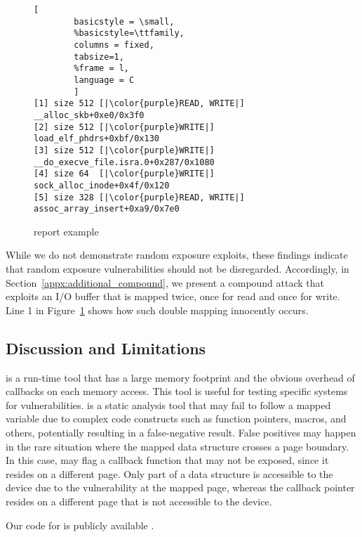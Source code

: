 %
\begin{figure}[t]
\begin{adjustbox}{width=0.9\linewidth}
        \begin{lstlisting}[
        basicstyle = \small,
        %basicstyle=\ttfamily,
        columns = fixed,
        tabsize=1,
        %frame = l,
        language = C
        ]
[1] size 512 [|\color{purple}READ, WRITE|] __alloc_skb+0xe0/0x3f0
[2] size 512 [|\color{purple}WRITE|] load_elf_phdrs+0xbf/0x130
[3] size 512 [|\color{purple}WRITE|] __do_execve_file.isra.0+0x287/0x1080
[4] size 64  [|\color{purple}WRITE|] sock_alloc_inode+0x4f/0x120
[5] size 328 [|\color{purple}READ, WRITE|] assoc_array_insert+0xa9/0x7e0
        \end{lstlisting}
\end{adjustbox}
        \caption{\dkasan report example}
        \label{fig:dkasan-report}
\end{figure}

While we do not demonstrate random exposure exploits, these findings indicate that random exposure vulnerabilities should not be disregarded. Accordingly, in Section~\ref{appx:additional_compound}, we present a compound attack that exploits an I/O buffer that is mapped twice, once for read and once for write. Line 1 in Figure~\ref{fig:dkasan-report}  shows how such double mapping innocently occurs.

\subsection{Discussion and Limitations}
\dkasan is a run-time tool that has a large memory footprint and the obvious overhead of callbacks on each memory access. This tool is useful for testing specific systems for vulnerabilities.
\tool is a static analysis tool that may fail to follow a mapped variable due to complex code constructs such as function pointers, macros, and others, potentially resulting in a false-negative result. False positives may happen in the rare situation 
where the mapped data structure crosses a  page boundary. In this case, \tool may flag a callback function that may not be exposed, since it resides on a different page. Only part of a data structure is accessible to the device due to the \subpage{} vulnerability at the mapped page, whereas the callback pointer resides on a different page that is not accessible to the device.%

Our code for \dkasan is publicly available \cite{DKASAN}.